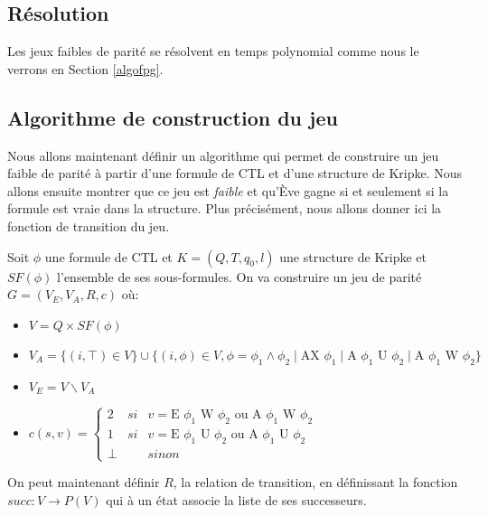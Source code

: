 \documentclass[10pt,a4paper]{article}
\begin{document}
\subsection{Résolution}
Les jeux faibles de parité se résolvent en temps polynomial comme nous le verrons en Section \ref{algofpg}.

\subsection{Algorithme de construction du jeu}
Nous allons maintenant définir un algorithme qui permet de construire un jeu faible de parité à partir d'une formule de CTL et d'une structure de Kripke. Nous allons ensuite montrer que ce jeu est \emph{faible} et qu'Ève gagne si et seulement si la formule est vraie dans la structure. Plus précisément, nous allons donner ici la fonction de transition du jeu.

Soit $\phi$ une formule de CTL et $K = (Q,T,q_0,l)$  une structure de Kripke et $SF(\phi)$ l'ensemble de ses sous-formules.
On va construire un jeu de parité $G = (V_E,V_A,R,c)$ où:
\begin{itemize}
	\item $V = Q \times SF(\phi)$
	\item $V_A = \{(i, \top ) \in V\} \cup \{(i, \phi) \in V, \phi = \phi_1 \land \phi_2 \mid \mbox{AX } \phi_1\mid \mbox{A } \phi_1 \mbox{ U } \phi_2 \mid \mbox{A } \phi_1 \mbox{ W } \phi_2\}$
	\item $V_E = V \backslash V_A$
	\item $c(s,v) = \left \{
	\begin{array}{rcl}
		2 & si & v = \mbox{E } \phi_1 \mbox{ W } \phi_2\text{ ou }\mbox{A } \phi_1 \mbox{ W } \phi_2\\
		1 & si & v = \mbox{E } \phi_1 \mbox{ U } \phi_2\text{ ou }\mbox{A } \phi_1 \mbox{ U } \phi_2\\
		\bot && sinon
	\end{array}
	\right .$
\end{itemize}

\bigskip

On peut maintenant définir $R$, la relation de transition, en définissant la fonction $succ : V \to P(V)$ qui à un état associe la liste de ses successeurs.\\
\end{document}
